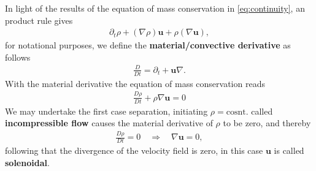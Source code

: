 In light of the results of the equation of mass conservation
in \ref{eq:continuity}, an product rule gives
\begin{align}
    \partial_t \rho + (\nabla \rho)\mathbf{u} + \rho(\nabla \mathbf{u}),
\end{align}
for notational purposes, we define the \textbf{material/convective derivative}
as follows
\begin{align}
    \frac{D}{Dt} = \partial_t + \mathbf{u}\nabla.
\end{align}
With the material derivative the equation of mass conservation reads
\begin{align}
    \frac{D\rho}{Dt} + \rho \nabla\mathbf{u} = 0
\end{align}
We may undertake the first case separation, initiating $\rho = \text{cosnt.}$
called \textbf{incompressible flow} causes the material derivative of $\rho$ to
be zero, and thereby
\begin{align}
    \frac{D\rho}{Dt} = 0 \quad \Rightarrow \quad \nabla \mathbf{u} = 0,
\end{align}
following that the divergence of the velocity field is zero, in this case
$\mathbf{u}$ is called \textbf{solenoidal}.
